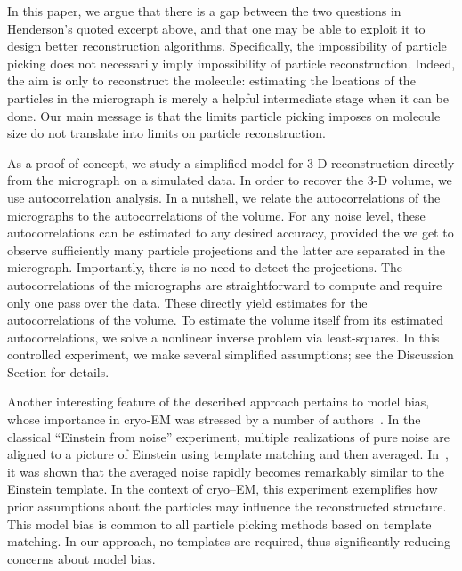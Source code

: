 \documentclass[english,11pt]{article}
\newcommand{\1}{\mathbf{1}}
\newcommand{\TODO}[1]{{\color{red}{[#1]}}}
\numberwithin{equation}{section}
\theoremstyle{plain}
\theoremstyle{definition}
\theoremstyle{remark}
\theoremstyle{plain}
\theoremstyle{remark}
\theoremstyle{plain}
\theoremstyle{plain}
\begin{document}
In this paper, we argue that there is a gap between the two questions in Henderson's quoted excerpt above, and that one may be able to exploit it to design better reconstruction algorithms.
Specifically, the impossibility of particle picking does not necessarily imply impossibility of particle reconstruction.
Indeed, the aim is only to reconstruct the molecule: estimating the locations of the particles in the micrograph is merely a helpful intermediate stage when it can be done. Our main message is that the limits particle picking imposes on molecule size do not translate into limits on particle reconstruction.

As a proof of concept, we study a simplified model for 3-D reconstruction directly from the micrograph on a simulated data. 
In order to recover the 3-D volume, we use autocorrelation analysis. In a nutshell, we relate the autocorrelations of the micrographs to the autocorrelations of the volume.
For any noise level, these autocorrelations can be estimated to any desired accuracy, provided the we get to observe sufficiently many particle projections and the latter are separated in the micrograph. Importantly, there is no need to detect the projections. The autocorrelations of the micrographs are straightforward to compute and require only one pass over the data. These directly yield estimates for the autocorrelations of the volume. To estimate the volume itself from its estimated autocorrelations, we solve a nonlinear inverse problem via least-squares. In this controlled experiment, we make several simplified assumptions; see the Discussion Section for details. 
\TODO{Do we want to stress that we get only low-resolution of the volume?}


Another interesting feature of the described approach pertains to model bias, whose importance in cryo-EM was stressed by a number of authors~\cite{shatsky2009method,vanheel1992correlation,henderson2013avoiding,vanheel2013finding}. In the classical ``Einstein from noise'' experiment, multiple realizations of pure noise are aligned to a picture of Einstein using template matching and then averaged. In~\cite{shatsky2009method}, it was shown that the averaged noise rapidly becomes remarkably similar to the Einstein template. In the context of cryo--EM, this experiment exemplifies how prior assumptions about the particles may influence the reconstructed structure. This model bias is common to all particle picking methods based on template matching. In our approach, no templates are required, thus significantly reducing concerns about model bias. \TODO{To add reference to our example.}
\end{document}
